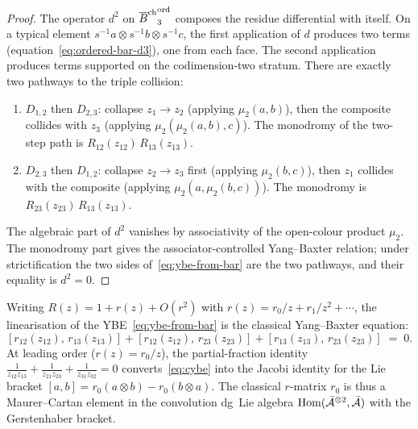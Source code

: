 \begin{proof}
The operator $d^2$ on ${\overline{B}^{\mathrm{ch}}}_3^{\mathrm{ord}}$ composes
the residue differential with itself. On a typical element
$s^{-1}a\otimes s^{-1}b\otimes s^{-1}c$, the first
application of $d$ produces two terms
(equation~\eqref{eq:ordered-bar-d3}), one from each face.
The second application produces terms supported on the
codimension-two stratum. There are exactly two pathways
to the triple collision:
\begin{enumerate}[label=(\roman*)]
\item $D_{1,2}$ then $D_{2,3}$: collapse $z_1\to z_2$
 (applying \(\mu_2(a,b)\)), then the composite collides
 with $z_3$ (applying \(\mu_2(\mu_2(a,b),c)\)).
 The monodromy of the two-step path is
 $R_{12}(z_{12})\,R_{13}(z_{13})$.
\item $D_{2,3}$ then $D_{1,2}$: collapse $z_2\to z_3$
 first (applying \(\mu_2(b,c)\)), then $z_1$ collides with
 the composite (applying \(\mu_2(a,\mu_2(b,c))\)).
 The monodromy is
 $R_{23}(z_{23})\,R_{13}(z_{13})$.
\end{enumerate}
The algebraic part of $d^2$ vanishes by associativity of
the open-colour product \(\mu_2\).  The monodromy part gives the
associator-controlled Yang--Baxter relation; under strictification the
two sides of~\eqref{eq:ybe-from-bar} are the two pathways, and their
equality is $d^2=0$.
\end{proof}

\begin{corollary}
\label{cor:classical-ybe}
Writing $R(z)=1+r(z)+O(r^2)$ with
$r(z)=r_0/z+r_1/z^2+\cdots$, the linearisation of
the YBE~\eqref{eq:ybe-from-bar} is the classical
Yang--Baxter equation:
\begin{equation}\label{eq:cybe}
[r_{12}(z_{12}),\,r_{13}(z_{13})]
+[r_{12}(z_{12}),\,r_{23}(z_{23})]
+[r_{13}(z_{13}),\,r_{23}(z_{23})]
\;=\;0.
\end{equation}
At leading order ($r(z)=r_0/z$), the partial-fraction
identity
$\tfrac{1}{z_{12}z_{13}}+\tfrac{1}{z_{21}z_{23}}
+\tfrac{1}{z_{31}z_{32}}=0$
converts~\eqref{eq:cybe} into the Jacobi identity for the
Lie bracket $[a,b]=r_0(a\otimes b)-r_0(b\otimes a)$. The
classical $r$-matrix $r_0$ is thus a Maurer--Cartan element
in the convolution dg~Lie algebra
$\operatorname{Hom}(\bar{\mathcal{A}}^{\otimes 2},\bar{\mathcal{A}})$ with the
Gerstenhaber bracket.
\end{corollary}

